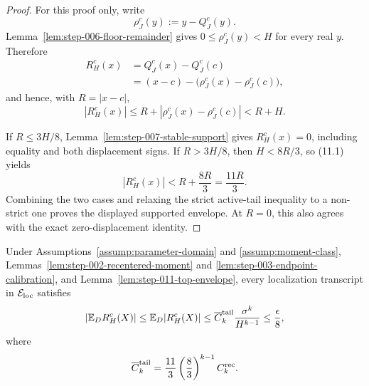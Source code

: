 \begin{proof}
For this proof only, write
\[
\rho_J^c(y):=y-Q_J^c(y).
\]
Lemma~\ref{lem:step-006-floor-remainder} gives
\(0\leq\rho_J^c(y)<H\) for every real \(y\). Therefore
\[
\begin{aligned}
R_H^c(x)
&=Q_J^c(x)-Q_J^c(c)\\
&=(x-c)-\bigl(\rho_J^c(x)-\rho_J^c(c)\bigr),
\end{aligned}
\]
and hence, with \(R=|x-c|\),
\[
|R_H^c(x)|
\leq R+|\rho_J^c(x)-\rho_J^c(c)|
<R+H.
\tag{11.1}
\]

If \(R\leq3H/8\), Lemma~\ref{lem:step-007-stable-support} gives \(R_H^c(x)=0\),
including equality and both displacement signs. If \(R>3H/8\), then
\(H<8R/3\), so (11.1) yields
\[
|R_H^c(x)|<R+\frac{8R}{3}=\frac{11R}{3}.
\]
Combining the two cases and relaxing the strict active-tail inequality to a
non-strict one proves the displayed supported envelope. At \(R=0\), this also
agrees with the exact zero-displacement identity.
\end{proof}

\begin{lemma}\label{lem:step-011-top-bias}
Under Assumptions~\ref{assump:parameter-domain} and
\ref{assump:moment-class}, Lemmas~\ref{lem:step-002-recentered-moment} and
\ref{lem:step-003-endpoint-calibration}, and
Lemma~\ref{lem:step-011-top-envelope}, every localization transcript in
\(\mathcal E_{\rm loc}\) satisfies
\[
\left|\mathbb E_D R_H^c(X)\right|
\leq\mathbb E_D|R_H^c(X)|
\leq
\overline C_k^{\rm tail}\frac{\sigma^k}{H^{k-1}}
\leq\frac{\epsilon}{8},
\]
where
\[
\overline C_k^{\rm tail}
=\frac{11}{3}\left(\frac83\right)^{k-1}C_k^{\rm rec}.
\]
\end{lemma}

